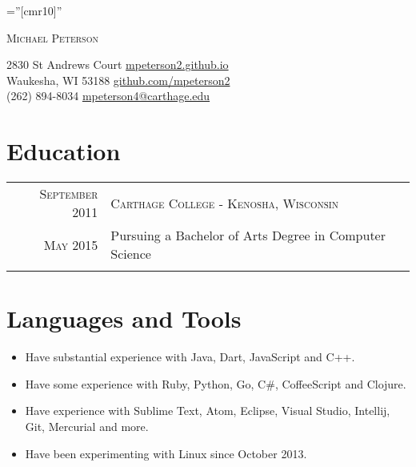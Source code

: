 \documentclass[letterpaper,10pt]{article}
\begin{document}
    \pagestyle{empty} %
    
    \font\fb=''[cmr10]'' %
    
    \par{\centering
    		{\Huge \textsc{Michael Peterson}
    	}\bigskip\par}
    	
    
        2830 St Andrews Court \hfill             
        \href{http://mpeterson2.github.io/}{mpeterson2.github.io} \\
        Waukesha, WI 53188 \hfill
        \href{https://github.com/mpeterson2}{github.com/mpeterson2} \\
        (262) 894-8034 \hfill
        \href{mailto:mpeterson4@carthage.edu}{mpeterson4@carthage.edu} \\
    
    
    \section{Education}
    \begin{tabular}{r|p{13.9cm}}
     
     \textsc{September 2011} & \textsc{Carthage College - Kenosha, Wisconsin} \\
     \textsc{May 2015} &
     Pursuing a Bachelor of Arts Degree in Computer Science\\\multicolumn{2}{c}{}\\
    
    \end{tabular}
    
    \section{Languages and Tools}
      \begin{itemize}
        \item Have substantial experience with Java, Dart, JavaScript and C++.
        \item Have some experience with Ruby, Python, Go, C\#, CoffeeScript and Clojure.
        \item Have experience with Sublime Text, Atom, Eclipse, Visual Studio, Intellij, Git, Mercurial and more.
        \item Have been experimenting with Linux since October 2013.
      \end{itemize}
    
\end{document}
